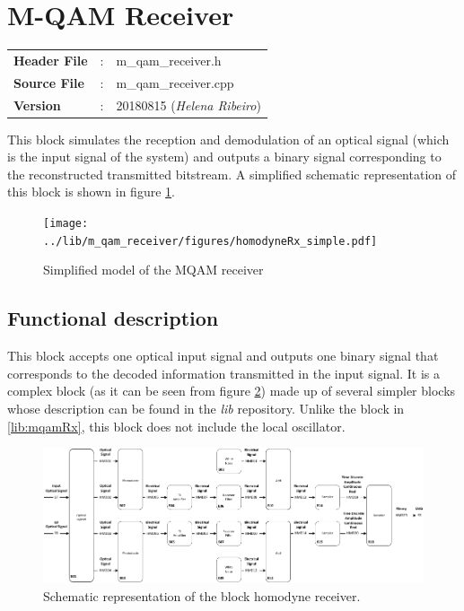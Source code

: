 \clearpage

\section{M-QAM Receiver}\label{lib:homodyneRx}

\begin{tcolorbox}	
	\begin{tabular}{p{2.75cm} p{0.2cm} p{10.5cm}} 	
		\textbf{Header File}   &:& m\_qam\_receiver.h \\
		\textbf{Source File}   &:& m\_qam\_receiver.cpp \\
        \textbf{Version}       &:& 20180815 (\emph{Helena Ribeiro})\\
	\end{tabular}
\end{tcolorbox}

This block simulates the reception and demodulation of an optical
signal (which is the input signal of the system) and outputs a binary signal
corresponding to the reconstructed transmitted bitstream.
 A simplified schematic representation of this block is shown in
figure
\ref{fig:homodyneRx_simple}.

\begin{figure}[h]
	\centering
	\texttt{[image: ../lib/m\_qam\_receiver/figures/homodyneRx\_simple.pdf]}
	\caption{Simplified model of the MQAM
	receiver}\label{fig:homodyneRx_simple}
\end{figure}

\subsection*{Functional description}

This block accepts one optical input signal and outputs one binary signal that
corresponds to the decoded information transmitted in the input signal. It is a
complex
block (as it can be seen from figure \ref{fig:homodyneRx_blocks}) made up of
several simpler blocks whose description can be found in the
\textit{lib} repository. Unlike the block in \ref{lib:mqamRx}, this block does
not include the local oscillator.

\begin{figure}[h]
	\centering
	\includegraphics[width=\textwidth]{../lib/m_qam_receiver/figures/homodyneRx_blocks.pdf}
	\caption{Schematic representation of the block homodyne
	receiver.}\label{fig:homodyneRx_blocks}
\end{figure}
\pagebreak

